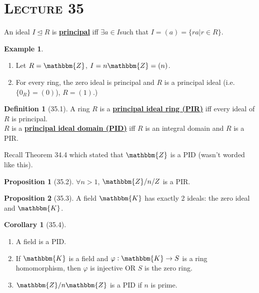 \documentclass{article}
\newcommand{\Z}{\mathbbm{Z}}
\newcommand{\define}[1]{\textbf{\underline{#1}}}
\newcommand{\func}[3]{#1: #2 \to #3}
\theoremstyle{definition}
\newtheorem*{defn}{Definition}
\newtheorem*{cor}{Corollary}
\newtheorem*{prop}{Proposition}
\newtheorem*{ex}{Example}
\theoremstyle{remark}
\newcommand{\ideal}{\unlhd}
\newcommand{\K}{\mathbbm{K}}
\begin{document}
    \section*{\textbf{\textsc{Lecture 35}}}{
        An ideal $I \ideal R$ is \define{principal} iff $\exists a \in I$such that $I=(a)=\{ra|r\in R\}$.
        
        \begin{ex}
            \begin{enumerate}
                \item Let $R=\Z$, $I=n\Z=(n)$.
                \item For every ring, the zero ideal is principal and $R$ is a principal ideal (i.e. $\{0_R\}=(0)$), $R=(1)$.)
            \end{enumerate}
        \end{ex}
        
        \begin{defn}[35.1]
            A ring $R$ is a \define{principal ideal ring (PIR)} iff every ideal of $R$ is principal.\\
            $R$ is a \define{principal ideal domain (PID)} iff $R$ is an integral domain and $R$ is a PIR.
        \end{defn}
        
        Recall Theorem 34.4 which stated that $\Z$ is a PID (wasn't worded like this).
        
        \begin{prop}[35.2]
            $\forall n>1$, $\Z/n/Z$ is a PIR.
        \end{prop}
        
        \begin{prop}[35.3]
            A field $\K$ has exactly 2 ideals: the zero ideal and $\K$.
        \end{prop}
        
        \begin{cor}[35.4]
            \begin{enumerate}
                \item A field is a PID.
                \item If $\K$ is a field and $\func{\varphi}{\K}{S}$ is a ring homomorphism, then $\varphi$ is injective OR $S$ is the zero ring.
                \item $\Z/n\Z$ is a PID if $n$ is prime.
            \end{enumerate}
        \end{cor}
        
}
\end{document}
